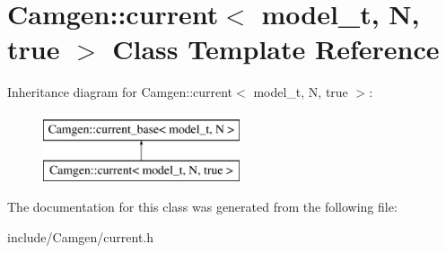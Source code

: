 \hypertarget{a00108}{}\section{Camgen\+:\+:current$<$ model\+\_\+t, N, true $>$ Class Template Reference}
\label{a00108}
Inheritance diagram for Camgen\+:\+:current$<$ model\+\_\+t, N, true $>$\+:\begin{figure}[H]
\begin{center}
\leavevmode
\includegraphics[height=2.000000cm]{a00108}
\end{center}
\end{figure}


The documentation for this class was generated from the following file\+:\begin{DoxyCompactItemize}
\item 
include/\+Camgen/current.\+h\end{DoxyCompactItemize}
